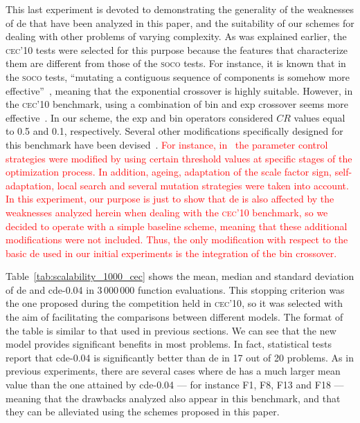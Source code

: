 \documentclass[preprint,3p]{elsarticle}
\newcommand{\CDE}{c{\sc de}}
\newcommand{\DE}{{\sc de}}
\begin{document}


This last experiment is devoted to demonstrating the generality of the weaknesses of \DE{} that have been analyzed in this
paper, and the suitability of our schemes for dealing with other problems of varying complexity.
%
As was explained earlier, the \textsc{cec'10} tests were selected for this purpose
because the features that characterize them are different from those of the \textsc{soco} tests.
%
For instance, it is known that in the \textsc{soco} tests, ``mutating a contiguous sequence of components is somehow more effective''~\cite{Zhao:13}, meaning
that the exponential crossover is highly suitable. %
%
However, in the \textsc{cec'10} benchmark, using a combination of bin and exp crossover seems more effective~\cite{Brest:10,Wang:10}.
%
In our scheme, the exp and bin operators considered $CR$ values equal to 0.5 and 0.1, respectively.
%
Several other modifications specifically designed for this benchmark have been devised~\cite{Brest:10,Brest:12}.
%
\textcolor{red}{
For instance, in~\cite{Brest:12} the parameter control strategies were modified by using certain threshold values at specific stages
of the optimization process.
%
In addition, ageing, adaptation of the scale factor sign, self-adaptation, local search and several mutation strategies were taken into account.
%
In this experiment, our purpose is just to show that \DE{} is also affected by the weaknesses analyzed herein when dealing with the \textsc{cec'10} benchmark,
so we decided to operate with a simple baseline scheme, meaning that these additional modifications were not included.
%
Thus, the only modification with respect to the basic \DE{} used in our initial experiments is the integration of the bin crossover.
}

Table~\ref{tab:scalability_1000_cec} shows the mean, median and standard deviation
of \DE{} and \CDE{}-0.04 in 3$\,$000$\,$000 function evaluations.
%
This stopping criterion was the one proposed during the competition held in \textsc{cec'10}, so it was selected with the aim of facilitating
the comparisons between different models.
%
The format of the table is similar to that used in previous sections.
%
We can see that the new model provides significant benefits in most problems.
%
In fact, statistical tests report that \CDE{}-0.04 is significantly better than \DE{} in 17 out of 20 problems.
%
As in previous experiments, there are several cases where \DE{} has a much larger mean value than the one attained by \CDE{}-0.04
--- for instance F1, F8, F13 and F18 --- meaning
that the drawbacks analyzed also appear in this benchmark, and that they can be alleviated using the schemes proposed in this paper.
\end{document}
